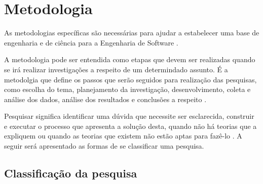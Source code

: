 \chapter{Metodologia}

As metodologias específicas são necessárias para ajudar a estabelecer uma base de engenharia e de ciência para a Engenharia de Software \cite{Wohlin:2000}.

A metodologia pode ser entendida como etapas que devem ser realizadas quando se irá realizar investigações a respeito de um determindado assunto. É a metodolgia que define os passos que serão seguidos para realização das pesquisas, como escolha do tema, planejamento da investigação, desenvolvimento, coleta e análise dos dados, análise dos resultados e conclusões a respeito \cite{Moresi:2003}.

Pesquisar significa identificar uma dúvida que necessite ser esclarecida, construir e executar o processo que apresenta a solução desta, quando não há teorias que a expliquem ou quando as teorias que existem não estão aptas para fazê-lo \cite{Koche:1997}. A seguir será apresentado as formas de se classificar uma pesquisa.

\section{Classificação da pesquisa}


